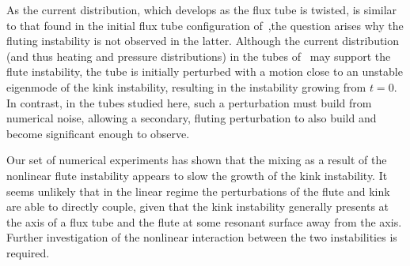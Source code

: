 \documentclass[fleqn,usenatbib]{mnras}
\newcommand{\rs}[2]{{#2}}
\begin{document}
As the current distribution, which develops as the flux tube is twisted, is similar to that found in the initial flux tube configuration of~\cite{quinnEffectAnisotropicViscosity2020},the question arises why the fluting instability is not observed in the latter. Although the current distribution (and thus heating and pressure distributions) in the tubes of~\cite{quinnEffectAnisotropicViscosity2020} may support the flute instability, the tube is initially perturbed with a motion close to an unstable eigenmode of the kink instability, resulting in the instability growing from $t=0$. In contrast, in the tubes studied here, such a perturbation must build from numerical noise, allowing a secondary, fluting perturbation to also build and become significant enough to observe.

\rs{This set of experiments}{Our set of numerical experiments} has
shown that the mixing as a result of the nonlinear \rs{fluting}{flute}
instability appears to slow the growth of the kink instability. \rs{In
  the linear regime it seems unlikely that}{It seems unlikely that in
  the linear regime} the \rs{linear}{} perturbations of \rs{either}{} the
\rs{fluting}{flute} \rs{or}{and} kink are able to directly couple, given that
the kink instability generally presents at the axis of a flux tube and
the \rs{fluting}{flute} at some resonant surface away from the
axis. Further investigation of the nonlinear interaction between the
two instabilities is required. 
\end{document}
